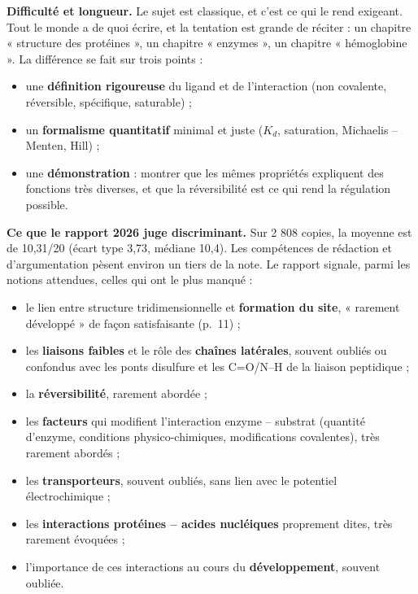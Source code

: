 \documentclass[11pt,a4paper]{article}
\providecommand{\tightlist}{\setlength{\itemsep}{0pt}\setlength{\parskip}{0pt}}
\begin{document}
\textbf{Difficulté et longueur.} Le sujet est classique, et c'est ce qui le rend exigeant. Tout le monde a de quoi écrire, et la tentation est grande de réciter : un chapitre « structure des protéines », un chapitre « enzymes », un chapitre « hémoglobine ». La différence se fait sur trois points :

\begin{itemize}
\tightlist
\item
  une \textbf{définition rigoureuse} du ligand et de l'interaction (non covalente, réversible, spécifique, saturable) ;
\item
  un \textbf{formalisme quantitatif} minimal et juste (\(K_d\), saturation, Michaelis -- Menten, Hill) ;
\item
  une \textbf{démonstration} : montrer que les mêmes propriétés expliquent des fonctions très diverses, et que la réversibilité est ce qui rend la régulation possible.
\end{itemize}

\textbf{Ce que le rapport 2026 juge discriminant.} Sur 2 808 copies, la moyenne est de 10,31/20 (écart type 3,73, médiane 10,4). Les compétences de rédaction et d'argumentation pèsent environ un tiers de la note. Le rapport signale, parmi les notions attendues, celles qui ont le plus manqué :

\begin{itemize}
\tightlist
\item
  le lien entre structure tridimensionnelle et \textbf{formation du site}, « rarement développé » de façon satisfaisante (p.~11) ;
\item
  les \textbf{liaisons faibles} et le rôle des \textbf{chaînes latérales}, souvent oubliés ou confondus avec les ponts disulfure et les C=O/N--H de la liaison peptidique ;
\item
  la \textbf{réversibilité}, rarement abordée ;
\item
  les \textbf{facteurs} qui modifient l'interaction enzyme -- substrat (quantité d'enzyme, conditions physico-chimiques, modifications covalentes), très rarement abordés ;
\item
  les \textbf{transporteurs}, souvent oubliés, sans lien avec le potentiel électrochimique ;
\item
  les \textbf{interactions protéines -- acides nucléiques} proprement dites, très rarement évoquées ;
\item
  l'importance de ces interactions au cours du \textbf{développement}, souvent oubliée.
\end{itemize}
\end{document}
